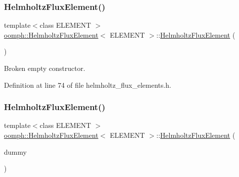 \subsubsection{\texorpdfstring{Helmholtz\+Flux\+Element()}{HelmholtzFluxElement()}\hspace{0.1cm}{\footnotesize\ttfamily [2/3]}}
{\footnotesize\ttfamily template$<$class E\+L\+E\+M\+E\+NT $>$ \\
\hyperlink{classoomph_1_1HelmholtzFluxElement}{oomph\+::\+Helmholtz\+Flux\+Element}$<$ E\+L\+E\+M\+E\+NT $>$\+::\hyperlink{classoomph_1_1HelmholtzFluxElement}{Helmholtz\+Flux\+Element} (\begin{DoxyParamCaption}{ }\end{DoxyParamCaption})\hspace{0.3cm}{\ttfamily [inline]}}



Broken empty constructor. 



Definition at line 74 of file helmholtz\+\_\+flux\+\_\+elements.\+h.

\mbox{\label{classoomph_1_1HelmholtzFluxElement_a6a2ee949191b2634cd3d5cd305f1982b}} 
\subsubsection{\texorpdfstring{Helmholtz\+Flux\+Element()}{HelmholtzFluxElement()}\hspace{0.1cm}{\footnotesize\ttfamily [3/3]}}
{\footnotesize\ttfamily template$<$class E\+L\+E\+M\+E\+NT $>$ \\
\hyperlink{classoomph_1_1HelmholtzFluxElement}{oomph\+::\+Helmholtz\+Flux\+Element}$<$ E\+L\+E\+M\+E\+NT $>$\+::\hyperlink{classoomph_1_1HelmholtzFluxElement}{Helmholtz\+Flux\+Element} (\begin{DoxyParamCaption}\item[{const \hyperlink{classoomph_1_1HelmholtzFluxElement}{Helmholtz\+Flux\+Element}$<$ E\+L\+E\+M\+E\+NT $>$ \&}]{dummy }\end{DoxyParamCaption})\hspace{0.3cm}{\ttfamily [inline]}}



